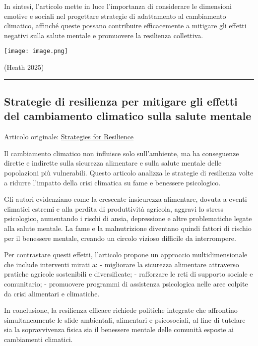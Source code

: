 \documentclass[
]{article}
\begin{document}
In sintesi, l'articolo mette in luce l'importanza di considerare le
dimensioni emotive e sociali nel progettare strategie di adattamento al
cambiamento climatico, affinché queste possano contribuire efficacemente
a mitigare gli effetti negativi sulla salute mentale e promuovere la
resilienza collettiva.

\texttt{[image: image.png]}

(Heath 2025)

\begin{center}\rule{0.5\linewidth}{0.5pt}\end{center}

\subsection{Strategie di resilienza per mitigare gli effetti del
cambiamento climatico sulla salute
mentale}\label{strategie-di-resilienza-per-mitigare-gli-effetti-del-cambiamento-climatico-sulla-salute-mentale}

Articolo originale:
\href{https://www.sciencedirect.com/science/article/pii/S2666154325003941}{Strategies
for Resilience}

Il cambiamento climatico non influisce solo sull'ambiente, ma ha
conseguenze dirette e indirette sulla sicurezza alimentare e sulla
salute mentale delle popolazioni più vulnerabili. Questo articolo
analizza le strategie di resilienza volte a ridurre l'impatto della
crisi climatica su fame e benessere psicologico.

Gli autori evidenziano come la crescente insicurezza alimentare, dovuta
a eventi climatici estremi e alla perdita di produttività agricola,
aggravi lo stress psicologico, aumentando i rischi di ansia, depressione
e altre problematiche legate alla salute mentale. La fame e la
malnutrizione diventano quindi fattori di rischio per il benessere
mentale, creando un circolo vizioso difficile da interrompere.

Per contrastare questi effetti, l'articolo propone un approccio
multidimensionale che include interventi mirati a: - migliorare la
sicurezza alimentare attraverso pratiche agricole sostenibili e
diversificate; - rafforzare le reti di supporto sociale e comunitario; -
promuovere programmi di assistenza psicologica nelle aree colpite da
crisi alimentari e climatiche.

In conclusione, la resilienza efficace richiede politiche integrate che
affrontino simultaneamente le sfide ambientali, alimentari e
psicosociali, al fine di tutelare sia la sopravvivenza fisica sia il
benessere mentale delle comunità esposte ai cambiamenti climatici.
\end{document}
